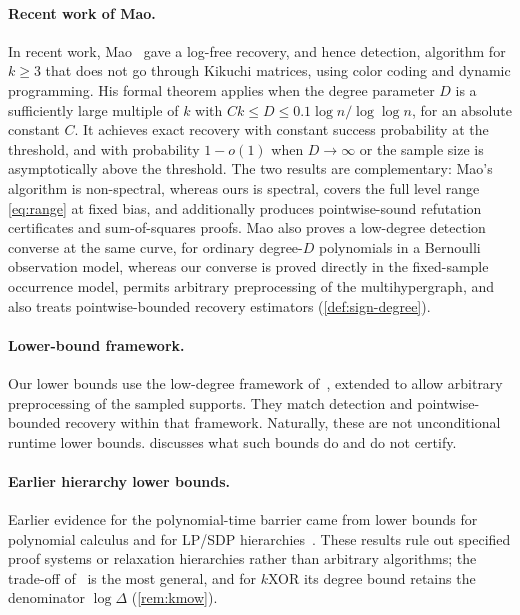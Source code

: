 \documentclass[11pt]{article}
\theoremstyle{definition}
\theoremstyle{remark}
\newcommand{\1}{\mathbf 1}
\numberwithin{equation}{section}
\begin{document}
\paragraph{Recent work of Mao.}
In recent work, Mao~\cite{Mao2026} gave a log-free recovery, and hence
detection, algorithm for $k\ge3$ that does not go through Kikuchi
matrices, using color coding and dynamic programming.  His formal
theorem applies when the degree parameter $D$ is a sufficiently large
multiple of $k$ with $Ck\le D\le0.1\log n/\log\log n$, for an absolute
constant $C$.  It achieves exact recovery with constant success
probability at the threshold, and with probability $1-o(1)$ when
$D\to\infty$ or the sample size is asymptotically above the threshold.
The two results are complementary: Mao's algorithm is non-spectral, whereas ours is spectral,
covers the full level range \cref{eq:range} at fixed bias, and
additionally produces pointwise-sound refutation certificates and
sum-of-squares proofs.  Mao also proves a low-degree detection converse
at the same curve, for ordinary degree-$D$ polynomials in a Bernoulli
observation model, whereas our converse is proved directly in the fixed-sample
occurrence model, permits arbitrary preprocessing of the multihypergraph, and also treats pointwise-bounded recovery
estimators (\cref{def:sign-degree}).

\paragraph{Lower-bound framework.}
Our lower bounds use the low-degree framework
of~\cite{HopkinsSteurer,KWB,SchrammWein,BHK+16,HKP+17,Hop18}, extended to allow arbitrary
preprocessing of the sampled supports.  They match detection and
pointwise-bounded recovery within that framework. Naturally, these are not
unconditional runtime lower bounds.   discusses what
such bounds do and do not certify.

\paragraph{Earlier hierarchy lower bounds.}
Earlier evidence for the polynomial-time barrier came from lower bounds
for polynomial calculus and for LP/SDP
hierarchies~\cite{Grigoriev,AlekhnovichRazborov,Schoenebeck,ODonnellWitmer,MoriWitmer,KMOW}.
These results rule out specified proof systems or relaxation
hierarchies rather than arbitrary algorithms; the trade-off
of~\cite{KMOW} is the most general, and for $k$XOR its degree bound
retains the denominator $\log\Delta$ (\cref{rem:kmow}).
\end{document}
